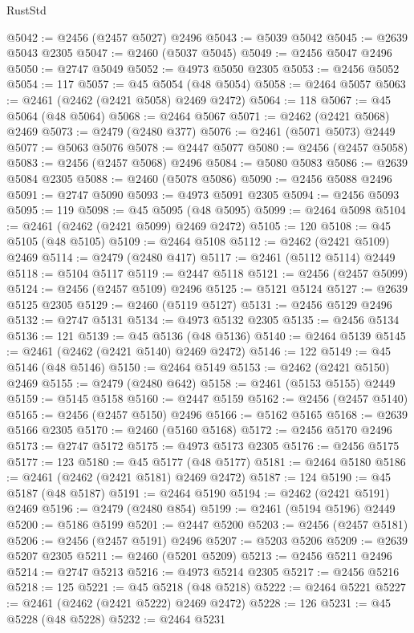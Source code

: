\begin{lexlean}{RustStd}
\begin{coremodule}
@5042 := @2456 (@2457 @5027) @2496
@5043 := @5039 @5042
@5045 := @2639 @5043 @2305
@5047 := @2460 (@5037 @5045)
@5049 := @2456 @5047 @2496
@5050 := @2747 @5049
@5052 := @4973 @5050 @2305
@5053 := @2456 @5052
@5054 := 117
@5057 := @45 @5054 (@48 @5054)
@5058 := @2464 @5057
@5063 := @2461 (@2462 (@2421 @5058) @2469 @2472)
@5064 := 118
@5067 := @45 @5064 (@48 @5064)
@5068 := @2464 @5067
@5071 := @2462 (@2421 @5068) @2469
@5073 := @2479 (@2480 @377)
@5076 := @2461 (@5071 @5073) @2449
@5077 := @5063 @5076
@5078 := @2447 @5077
@5080 := @2456 (@2457 @5058)
@5083 := @2456 (@2457 @5068) @2496
@5084 := @5080 @5083
@5086 := @2639 @5084 @2305
@5088 := @2460 (@5078 @5086)
@5090 := @2456 @5088 @2496
@5091 := @2747 @5090
@5093 := @4973 @5091 @2305
@5094 := @2456 @5093
@5095 := 119
@5098 := @45 @5095 (@48 @5095)
@5099 := @2464 @5098
@5104 := @2461 (@2462 (@2421 @5099) @2469 @2472)
@5105 := 120
@5108 := @45 @5105 (@48 @5105)
@5109 := @2464 @5108
@5112 := @2462 (@2421 @5109) @2469
@5114 := @2479 (@2480 @417)
@5117 := @2461 (@5112 @5114) @2449
@5118 := @5104 @5117
@5119 := @2447 @5118
@5121 := @2456 (@2457 @5099)
@5124 := @2456 (@2457 @5109) @2496
@5125 := @5121 @5124
@5127 := @2639 @5125 @2305
@5129 := @2460 (@5119 @5127)
@5131 := @2456 @5129 @2496
@5132 := @2747 @5131
@5134 := @4973 @5132 @2305
@5135 := @2456 @5134
@5136 := 121
@5139 := @45 @5136 (@48 @5136)
@5140 := @2464 @5139
@5145 := @2461 (@2462 (@2421 @5140) @2469 @2472)
@5146 := 122
@5149 := @45 @5146 (@48 @5146)
@5150 := @2464 @5149
@5153 := @2462 (@2421 @5150) @2469
@5155 := @2479 (@2480 @642)
@5158 := @2461 (@5153 @5155) @2449
@5159 := @5145 @5158
@5160 := @2447 @5159
@5162 := @2456 (@2457 @5140)
@5165 := @2456 (@2457 @5150) @2496
@5166 := @5162 @5165
@5168 := @2639 @5166 @2305
@5170 := @2460 (@5160 @5168)
@5172 := @2456 @5170 @2496
@5173 := @2747 @5172
@5175 := @4973 @5173 @2305
@5176 := @2456 @5175
@5177 := 123
@5180 := @45 @5177 (@48 @5177)
@5181 := @2464 @5180
@5186 := @2461 (@2462 (@2421 @5181) @2469 @2472)
@5187 := 124
@5190 := @45 @5187 (@48 @5187)
@5191 := @2464 @5190
@5194 := @2462 (@2421 @5191) @2469
@5196 := @2479 (@2480 @854)
@5199 := @2461 (@5194 @5196) @2449
@5200 := @5186 @5199
@5201 := @2447 @5200
@5203 := @2456 (@2457 @5181)
@5206 := @2456 (@2457 @5191) @2496
@5207 := @5203 @5206
@5209 := @2639 @5207 @2305
@5211 := @2460 (@5201 @5209)
@5213 := @2456 @5211 @2496
@5214 := @2747 @5213
@5216 := @4973 @5214 @2305
@5217 := @2456 @5216
@5218 := 125
@5221 := @45 @5218 (@48 @5218)
@5222 := @2464 @5221
@5227 := @2461 (@2462 (@2421 @5222) @2469 @2472)
@5228 := 126
@5231 := @45 @5228 (@48 @5228)
@5232 := @2464 @5231

\end{coremodule}
\end{lexlean}
